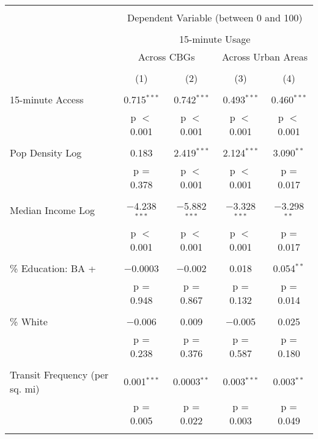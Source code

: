 
\begin{table}[!htbp] \centering 
  \caption{} 
  \label{} 
\begin{tabular}{@{\extracolsep{5pt}}lcccc} 
\\[-1.8ex]\hline 
\hline \\[-1.8ex] 
 & \multicolumn{4}{c}{Dependent Variable (between 0 and 100)} \\ 
\cline{2-5} 
\\[-1.8ex] & \multicolumn{4}{c}{15-minute Usage} \\ 
 & \multicolumn{2}{c}{Across CBGs} & \multicolumn{2}{c}{Across Urban Areas} \\ 
\\[-1.8ex] & (1) & (2) & (3) & (4)\\ 
\hline \\[-1.8ex] 
 15-minute Access & 0.715$^{***}$ & 0.742$^{***}$ & 0.493$^{***}$ & 0.460$^{***}$ \\ 
  & p $<$ 0.001 & p $<$ 0.001 & p $<$ 0.001 & p $<$ 0.001 \\ 
  & & & & \\ 
 Pop Density Log & 0.183 & 2.419$^{***}$ & 2.124$^{***}$ & 3.090$^{**}$ \\ 
  & p = 0.378 & p $<$ 0.001 & p $<$ 0.001 & p = 0.017 \\ 
  & & & & \\ 
 Median Income Log & $-$4.238$^{***}$ & $-$5.882$^{***}$ & $-$3.328$^{***}$ & $-$3.298$^{**}$ \\ 
  & p $<$ 0.001 & p $<$ 0.001 & p $<$ 0.001 & p = 0.017 \\ 
  & & & & \\ 
 \% Education: BA + & $-$0.0003 & $-$0.002 & 0.018 & 0.054$^{**}$ \\ 
  & p = 0.948 & p = 0.867 & p = 0.132 & p = 0.014 \\ 
  & & & & \\ 
 \% White & $-$0.006 & 0.009 & $-$0.005 & 0.025 \\ 
  & p = 0.238 & p = 0.376 & p = 0.587 & p = 0.180 \\ 
  & & & & \\ 
 Transit Frequency (per sq. mi) & 0.001$^{***}$ & 0.0003$^{**}$ & 0.003$^{***}$ & 0.003$^{**}$ \\ 
  & p = 0.005 & p = 0.022 & p = 0.003 & p = 0.049 \\ 
  & & & & \\ 

\end{tabular}
\end{table}

